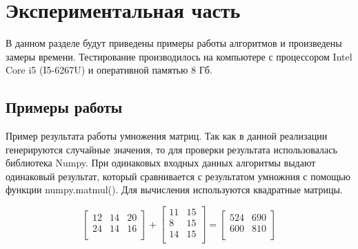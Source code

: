 \documentclass[12pt]{article}
\begin{document}
\section{Экспериментальная часть}
В данном разделе будут приведены примеры работы алгоритмов и произведены замеры времени. Тестирование производилось на компьютере с процессором Intel Core i5 (I5-6267U) и оперативной памятью 8 Гб. 
\subsection{Примеры работы}
Пример результата работы умножения матриц. Так как в данной реализации генерируются случайные значения, то для проверки результата использовалась библиотека Numpy. При одинаковых входных данных алгоритмы выдают одинаковый результат, который сравнивается с результатом умножния с помощью функции numpy.matmul(). Для вычисления используются квадратные матрицы.
\newline

{\centering
$$\begin{bmatrix} 
12 & 14 & 20 \\
24 & 14 & 16 \\
\end{bmatrix}
+
\begin{bmatrix} 
11 &15\\
8 & 15 \\
14 & 15 \\
\end{bmatrix}
=
\begin{bmatrix} 
524 & 690 \\
600 & 810 \\
\end{bmatrix}$$
}
\end{document}
